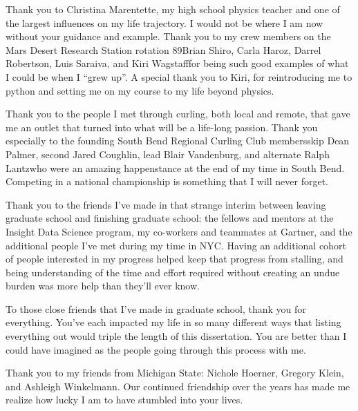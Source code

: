 \begin{acknowledge}
Thank you to Christina Marentette, my high school physics teacher and
one of the largest influences on my life trajectory. I would not be
where I am now without your guidance and example. Thank you to my crew
members on the Mars Desert Research Station rotation
89\textemdash{}Brian Shiro, Carla Haroz, Darrel Robertson, Luis Saraiva,
and Kiri Wagstaff\textemdash{}for being such good examples of what I
could be when I ``grew up''. A special thank you to Kiri, for
reintroducing me to python and setting me on my course to my life beyond
physics.

Thank you to the people I met through curling, both local and remote,
that gave me an outlet that turned into what will be a life-long
passion. Thank you especially to the founding South Bend Regional
Curling Club members\textemdash{}skip Dean Palmer, second Jared
Coughlin, lead Blair Vandenburg, and alternate Ralph
Lantz\textemdash{}who were an amazing happenstance at the end of my time
in South Bend. Competing in a national championship is something that I
will never forget.

Thank you to the friends I've made in that strange interim between
leaving graduate school and finishing graduate school: the fellows and
mentors at the Insight Data Science program, my co-workers and teammates
at Gartner, and the additional people I've met during my time in NYC.
Having an additional cohort of people interested in my progress helped
keep that progress from stalling, and being understanding of the time
and effort required without creating an undue burden was more help than
they'll ever know.

To those close friends that I've made in graduate school, thank you for
everything. You've each impacted my life in so many different ways that
listing everything out would triple the length of this dissertation. You
are better than I could have imagined as the people going through this
process with me.

Thank you to my friends from Michigan State: Nichole Hoerner, Gregory
Klein, and Ashleigh Winkelmann. Our continued friendship over the years
has made me realize how lucky I am to have stumbled into your lives.


\end{acknowledge}
